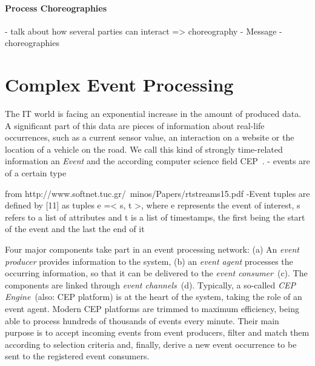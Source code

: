 
\paragraph{Process Choreographies}
- talk about how several parties can interact => choreography
- Message
- choreographies



\section{Complex Event Processing}\label{ch:bg:cep}
The IT world is facing an exponential increase in the amount of produced data. A significant part of this data are pieces of information about real-life occurrences, such as a current sensor value, an interaction on a website or the location of a vehicle on the road.
We call this kind of strongly time-related information an \textit{Event} and the according computer science field \ac{CEP}~\cite{evtprocessing}.
- events are of a certain type

from http://www.softnet.tuc.gr/~minos/Papers/rtstreams15.pdf
-Event tuples are defined by [11] as tuples e =< s, t >,
where e represents the event of interest, s refers to a list
of attributes and t is a list of timestamps, the first being
the start of the event and the last the end of it

Four major components take part in an event processing network: (a) An \textit{event producer} provides information to the system, (b) an \textit{event agent} processes the occurring information, so that it can be delivered to the \textit{event consumer}~(c). The components are linked through \textit{event channels}~(d).
Typically, a so-called \textit{\acs{CEP} Engine}~(also: CEP platform) is at the heart of the system, taking the role of an event agent.
Modern CEP platforms are trimmed to maximum efficiency, being able to process hundreds of thousands of events every minute.
Their main purpose is to accept incoming events from event producers, filter and match them according to selection criteria and, finally, derive a new event occurrence to be sent to the registered event consumers.

